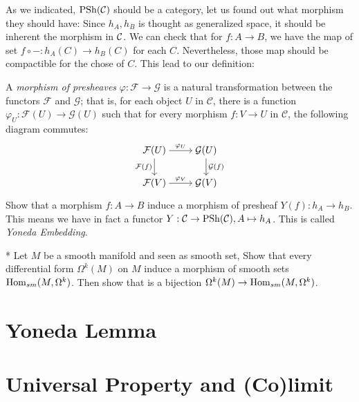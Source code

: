As we indicated, $\mathrm{PSh}(\mathcal{C})$ should be a category, let us found out what morphism they should have: Since $h_A,h_B$ is thought as generalized space, it should be inherent the morphism in $\mathcal{C}$. We can check that for $f:A\to B$, we have the map of set $ f\circ -: h_A(C)\to h_B(C)$ for each $C$. Nevertheless, those map should be compactible for the chose of $C$. This lead to our definition:
\begin{definition}
  
A \emph{morphism of presheaves} $\varphi : \mathcal{F} \to \mathcal{G}$ is a natural transformation between the functors $\mathcal{F}$ and $\mathcal{G}$; that is, for each object $U$ in $\mathcal{C}$, there is a function $\varphi_U : \mathcal{F}(U) \to \mathcal{G}(U)$ such that for every morphism $f : V \to U$ in $\mathcal{C}$, the following diagram commutes:
\[\begin{tikzcd}[ampersand replacement=\&,cramped]
  \mathcal{F}(U) \&  \mathcal{G}(U) \\
\mathcal{F}(V)   \& \mathcal{G}(V)
	\arrow["{\varphi_U}", from=1-1, to=1-2]
	\arrow["{\mathcal{F}(f)}"', from=1-1, to=2-1]
	\arrow["{\mathcal{G}(f)}", from=1-2, to=2-2]
	\arrow["{\varphi_V}", from=2-1, to=2-2]
\end{tikzcd}\]

\end{definition}
\begin{exercise}
  Show that a morphism $f:A\to B$ induce a morphism of presheaf $Y(f):h_A\to h_B$. This means we have in fact a functor $ Y: \mathcal{C} \to \mathrm{PSh}(\mathcal{C}), A\mapsto h_A $. This is called \emph{Yoneda Embedding}.
\end{exercise}
\begin{exercise}*
  Let $M$ be a smooth manifold and seen as smooth set, Show that every differential form $\Omega^k(M)$ on $M$ induce a morphism of smooth sets $\mathrm{Hom}_{sm}(M,\Omega^k)$. Then show that is a bijection $ \Omega^k(M)\to \mathrm{Hom}_{sm}(M,\Omega^k)$.
\end{exercise}
\section{Yoneda Lemma}

\section{Universal Property and (Co)limit}
